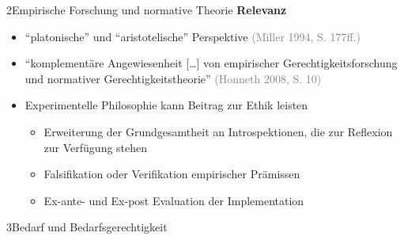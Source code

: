 \documentclass[xcolor=table,9pt,aspectratio=169]{beamer}
\begin{document}
\begin{frame}{\vspace*{10mm}2\hspace*{1em}Empirische Forschung und normative Theorie}
\textbf{Relevanz}\\
\medskip
\begin{itemize}
   \item \enquote{platonische} und \enquote{aristotelische} Perspektive \textcolor{gray}{(Miller 1994, S. 177ff.)}
   \item \enquote{komplementäre Angewiesenheit [\ldots] von empirischer Gerechtigkeitsforschung und normativer Gerechtigkeitstheorie} \textcolor{gray}{(Honneth 2008, S. 10)}
   \item Experimentelle Philosophie kann Beitrag zur Ethik leisten
   \begin{itemize}
      \item Erweiterung der Grundgesamtheit an Introspektionen, die zur Reflexion zur Verfügung stehen
      \item Falsifikation oder Verifikation empirischer Prämissen
      \item Ex-ante- und Ex-post Evaluation der Implementation
   \end{itemize}
\end{itemize}
\end{frame}


\begin{frame}
\begin{overlayarea}{\textwidth}{0.81\paperheight}{
   \vspace*{11mm}
   \textcolor{uolblue}
   {3\hspace*{1em}Bedarf und Bedarfsgerechtigkeit}
}
\end{overlayarea}
\end{frame}
\end{document}
